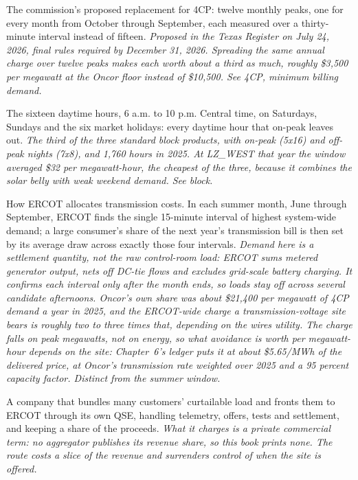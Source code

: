 \begin{description}[leftmargin=0pt,style=unboxed,itemsep=0.35em,parsep=0.15em]
\item[12CP (Twelve Coincident Peak)] \hypertarget{glossary:12cp}{}The commission's proposed replacement for 4CP: twelve monthly peaks, one for every month from October through September, each measured over a thirty-minute interval instead of fifteen. \emph{Proposed in the Texas Register on July 24, 2026, final rules required by December 31, 2026. Spreading the same annual charge over twelve peaks makes each worth about a third as much, roughly \$3,500 per megawatt at the Oncor floor instead of \$10,500. See 4CP, minimum billing demand.}
\item[2x16] \hypertarget{glossary:2x16}{}The sixteen daytime hours, 6 a.m. to 10 p.m. Central time, on Saturdays, Sundays and the six market holidays: every daytime hour that on-peak leaves out. \emph{The third of the three standard block products, with on-peak (5x16) and off-peak nights (7x8), and 1,760 hours in 2025. At LZ\_WEST that year the window averaged \$32 per megawatt-hour, the cheapest of the three, because it combines the solar belly with weak weekend demand. See block.}
\item[4CP (Four Coincident Peak)] \hypertarget{glossary:4cp}{}How ERCOT allocates transmission costs. In each summer month, June through September, ERCOT finds the single 15-minute interval of highest system-wide demand; a large consumer's share of the next year's transmission bill is then set by its average draw across exactly those four intervals. \emph{Demand here is a settlement quantity, not the raw control-room load: ERCOT sums metered generator output, nets off DC-tie flows and excludes grid-scale battery charging. It confirms each interval only after the month ends, so loads stay off across several candidate afternoons. Oncor's own share was about \$21,400 per megawatt of 4CP demand a year in 2025, and the ERCOT-wide charge a transmission-voltage site bears is roughly two to three times that, depending on the wires utility. The charge falls on peak megawatts, not on energy, so what avoidance is worth per megawatt-hour depends on the site: Chapter~6's ledger puts it at about \$5.65/MWh of the delivered price, at Oncor's transmission rate weighted over 2025 and a 95 percent capacity factor. Distinct from the summer window.}
\item[aggregator] \hypertarget{glossary:aggregator}{}A company that bundles many customers' curtailable load and fronts them to ERCOT through its own QSE, handling telemetry, offers, tests and settlement, and keeping a share of the proceeds. \emph{What it charges is a private commercial term: no aggregator publishes its revenue share, so this book prints none. The route costs a slice of the revenue and surrenders control of when the site is offered.}

\end{description}
